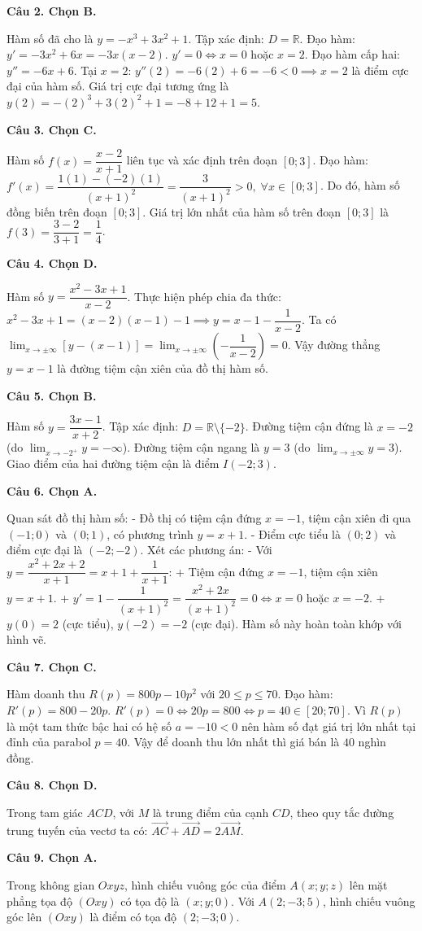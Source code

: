 \documentclass[12pt,a4paper]{article}
\newcommand{\loigiai}[1]{\par\medskip\Needspace{4\baselineskip}\noindent\textbf{#1}\par\nobreak}
\begin{document}
\loigiai{Câu 2. Chọn B.}
Hàm số đã cho là $y=-x^3+3x^2+1$.
Tập xác định: $D=\mathbb{R}$.
Đạo hàm: $y'=-3x^2+6x=-3x(x-2)$.
$y'=0 \iff x=0$ hoặc $x=2$.
Đạo hàm cấp hai: $y''=-6x+6$.
Tại $x=2$: $y''(2)=-6(2)+6=-6<0 \implies x=2$ là điểm cực đại của hàm số.
Giá trị cực đại tương ứng là $y(2)=-(2)^3+3(2)^2+1=-8+12+1=5$.

\loigiai{Câu 3. Chọn C.}
Hàm số $f(x)=\dfrac{x-2}{x+1}$ liên tục và xác định trên đoạn $[0;3]$.
Đạo hàm: $f'(x)=\dfrac{1(1)-(-2)(1)}{(x+1)^2}=\dfrac{3}{(x+1)^2} > 0,\; \forall x \in [0;3]$.
Do đó, hàm số đồng biến trên đoạn $[0;3]$.
Giá trị lớn nhất của hàm số trên đoạn $[0;3]$ là $f(3)=\dfrac{3-2}{3+1}=\dfrac{1}{4}$.

\loigiai{Câu 4. Chọn D.}
Hàm số $y=\dfrac{x^2-3x+1}{x-2}$.
Thực hiện phép chia đa thức:
$x^2-3x+1 = (x-2)(x-1) - 1 \implies y = x-1 - \dfrac{1}{x-2}$.
Ta có $\lim_{x\to \pm\infty} \left[ y - (x-1) \right] = \lim_{x\to \pm\infty} \left(-\dfrac{1}{x-2}\right) = 0$.
Vậy đường thẳng $y=x-1$ là đường tiệm cận xiên của đồ thị hàm số.

\loigiai{Câu 5. Chọn B.}
Hàm số $y=\dfrac{3x-1}{x+2}$.
Tập xác định: $D=\mathbb{R}\setminus\{-2\}$.
Đường tiệm cận đứng là $x=-2$ (do $\lim_{x\to -2^+} y = -\infty$).
Đường tiệm cận ngang là $y=3$ (do $\lim_{x\to \pm\infty} y = 3$).
Giao điểm của hai đường tiệm cận là điểm $I(-2;3)$.

\loigiai{Câu 6. Chọn A.}
Quan sát đồ thị hàm số:
- Đồ thị có tiệm cận đứng $x=-1$, tiệm cận xiên đi qua $(-1;0)$ và $(0;1)$, có phương trình $y=x+1$.
- Điểm cực tiểu là $(0;2)$ và điểm cực đại là $(-2;-2)$.
Xét các phương án:
- Với $y=\dfrac{x^2+2x+2}{x+1} = x+1+\dfrac{1}{x+1}$:
  + Tiệm cận đứng $x=-1$, tiệm cận xiên $y=x+1$.
  + $y'=1-\dfrac{1}{(x+1)^2}=\dfrac{x^2+2x}{(x+1)^2}=0 \iff x=0$ hoặc $x=-2$.
  + $y(0)=2$ (cực tiểu), $y(-2)=-2$ (cực đại).
Hàm số này hoàn toàn khớp với hình vẽ.

\loigiai{Câu 7. Chọn C.}
Hàm doanh thu $R(p)=800p-10p^2$ với $20\le p\le 70$.
Đạo hàm: $R'(p)=800-20p$.
$R'(p)=0 \iff 20p=800 \iff p=40 \in [20;70]$.
Vì $R(p)$ là một tam thức bậc hai có hệ số $a=-10<0$ nên hàm số đạt giá trị lớn nhất tại đỉnh của parabol $p=40$.
Vậy để doanh thu lớn nhất thì giá bán là $40$ nghìn đồng.

\loigiai{Câu 8. Chọn D.}
Trong tam giác $ACD$, với $M$ là trung điểm của cạnh $CD$, theo quy tắc đường trung tuyến của vectơ ta có:
$\vec{AC}+\vec{AD}=2\vec{AM}$.

\loigiai{Câu 9. Chọn A.}
Trong không gian $Oxyz$, hình chiếu vuông góc của điểm $A(x;y;z)$ lên mặt phẳng tọa độ $(Oxy)$ có tọa độ là $(x;y;0)$.
Với $A(2;-3;5)$, hình chiếu vuông góc lên $(Oxy)$ là điểm có tọa độ $(2;-3;0)$.
\end{document}
